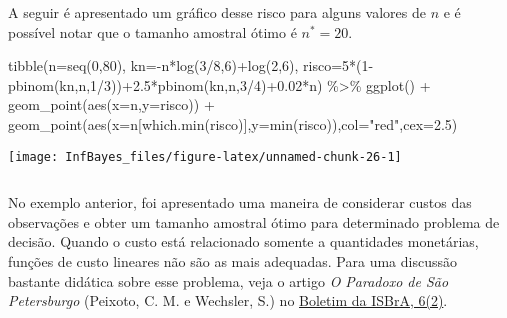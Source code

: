 \documentclass[
]{book}
\newenvironment{Shaded}{\begin{snugshade}}{\end{snugshade}}
\newcommand{\AttributeTok}[1]{\textcolor[rgb]{0.77,0.63,0.00}{#1}}
\newcommand{\DecValTok}[1]{\textcolor[rgb]{0.00,0.00,0.81}{#1}}
\newcommand{\FloatTok}[1]{\textcolor[rgb]{0.00,0.00,0.81}{#1}}
\newcommand{\FunctionTok}[1]{\textcolor[rgb]{0.00,0.00,0.00}{#1}}
\newcommand{\NormalTok}[1]{#1}
\newcommand{\SpecialCharTok}[1]{\textcolor[rgb]{0.00,0.00,0.00}{#1}}
\newcommand{\StringTok}[1]{\textcolor[rgb]{0.31,0.60,0.02}{#1}}
\begin{document}
A seguir é apresentado um gráfico desse risco para alguns valores de \(n\) e é possível notar que o tamanho amostral ótimo é \({n}^*=20\).

\begin{Shaded}
\begin{Highlighting}[]
\FunctionTok{tibble}\NormalTok{(}\AttributeTok{n=}\FunctionTok{seq}\NormalTok{(}\DecValTok{0}\NormalTok{,}\DecValTok{80}\NormalTok{),}
       \AttributeTok{kn=}\SpecialCharTok{{-}}\NormalTok{n}\SpecialCharTok{*}\FunctionTok{log}\NormalTok{(}\DecValTok{3}\SpecialCharTok{/}\DecValTok{8}\NormalTok{,}\DecValTok{6}\NormalTok{)}\SpecialCharTok{+}\FunctionTok{log}\NormalTok{(}\DecValTok{2}\NormalTok{,}\DecValTok{6}\NormalTok{),}
       \AttributeTok{risco=}\DecValTok{5}\SpecialCharTok{*}\NormalTok{(}\DecValTok{1}\SpecialCharTok{{-}}\FunctionTok{pbinom}\NormalTok{(kn,n,}\DecValTok{1}\SpecialCharTok{/}\DecValTok{3}\NormalTok{))}\SpecialCharTok{+}\FloatTok{2.5}\SpecialCharTok{*}\FunctionTok{pbinom}\NormalTok{(kn,n,}\DecValTok{3}\SpecialCharTok{/}\DecValTok{4}\NormalTok{)}\SpecialCharTok{+}\FloatTok{0.02}\SpecialCharTok{*}\NormalTok{n) }\SpecialCharTok{\%\textgreater{}\%} 
  \FunctionTok{ggplot}\NormalTok{() }\SpecialCharTok{+}
  \FunctionTok{geom\_point}\NormalTok{(}\FunctionTok{aes}\NormalTok{(}\AttributeTok{x=}\NormalTok{n,}\AttributeTok{y=}\NormalTok{risco)) }\SpecialCharTok{+} 
  \FunctionTok{geom\_point}\NormalTok{(}\FunctionTok{aes}\NormalTok{(}\AttributeTok{x=}\NormalTok{n[}\FunctionTok{which.min}\NormalTok{(risco)],}\AttributeTok{y=}\FunctionTok{min}\NormalTok{(risco)),}\AttributeTok{col=}\StringTok{"red"}\NormalTok{,}\AttributeTok{cex=}\FloatTok{2.5}\NormalTok{)}
\end{Highlighting}
\end{Shaded}

\begin{center}\texttt{[image: InfBayes\_files/figure-latex/unnamed-chunk-26-1]} \end{center}

\(~\)

No exemplo anterior, foi apresentado uma maneira de considerar custos das observações e obter um tamanho amostral ótimo para determinado problema de decisão. Quando o custo está relacionado somente a quantidades monetárias, funções de custo lineares não são as mais adequadas. Para uma discussão bastante didática sobre esse problema, veja o artigo \emph{O Paradoxo de São Petersburgo} (Peixoto, C. M. e Wechsler, S.) no \href{https://www.ime.usp.br/~isbra/boletim/boletim_2013_v06_n02.pdf}{Boletim da ISBrA, 6(2)}.
\end{document}
